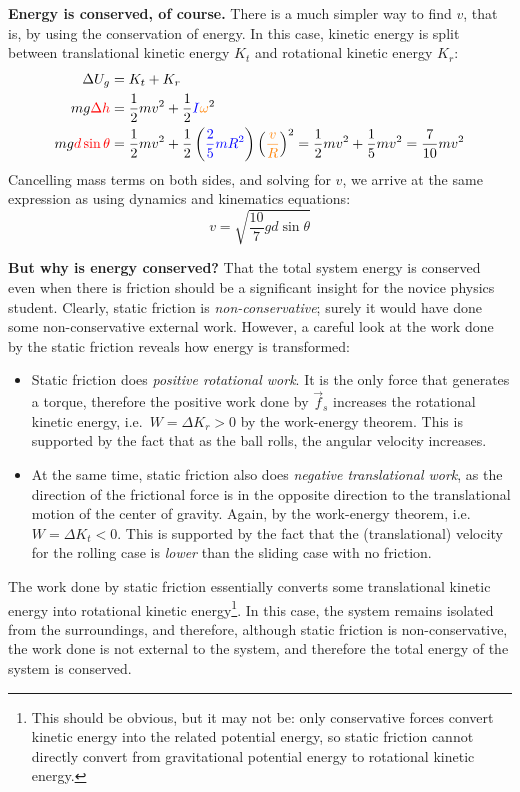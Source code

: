 \documentclass{../../oss-handout}
\begin{document}
\textbf{Energy is conserved, of course.} There is a much simpler way to find
$v$, that is, by using the conservation of energy. In this case, kinetic
energy is split between translational kinetic energy $K_t$ and rotational
kinetic energy $K_r$:
\begin{align*}
  \Delta U_g&=K_t+K_r\\
  mg\textcolor{red}{\Delta h}&=\frac12 mv^2+
  \frac12
  \textcolor{blue}{I}\textcolor{orange}{\omega}^2\\
  mg\textcolor{red}{d\sin\theta}&=\frac12 mv^2+\frac12
  \left(\textcolor{blue}{\frac25 mR^2}\right)
  \left(\textcolor{orange}{\frac vR}\right)^2
  =\frac12 mv^2+\frac15mv^2=\frac7{10}mv^2
\end{align*}
Cancelling mass terms on both sides, and solving for $v$, we arrive at
the same expression as using dynamics and kinematics equations:
\begin{equation}
  v=\sqrt{\frac{10}{7}gd\sin\theta}
\end{equation}

\textbf{But why is energy conserved?} That the total system energy is conserved
even when there is friction should be a significant insight for the novice
physics student. Clearly, static friction is \emph{non-conservative}; surely it
would have done some non-conservative external work. However, a careful look at
the work done by the static friction reveals how energy is transformed:
\begin{itemize}[topsep=0pt]
\item Static friction does \emph{positive rotational work}. It is the only
  force that generates a torque, therefore the positive work done by $\vec f_s$
  increases the rotational kinetic energy, i.e.\ $W=\Delta K_r>0$ by the
  work-energy theorem. This is supported by the fact that as the ball rolls, the
  angular velocity increases.
\item At the same time, static friction also does \emph{negative translational
  work}, as the direction of the frictional force is in the opposite direction
  to the translational motion of the center of gravity. Again, by the
  work-energy theorem, i.e.\ $W=\Delta K_t<0$. This is supported by the fact
  that the (translational) velocity for the rolling case is \emph{lower} than
  the sliding case with no friction.
\end{itemize}
The work done by static friction essentially converts some translational kinetic
energy into rotational kinetic energy\footnote{This should be obvious, but it
  may not be: only conservative forces convert kinetic energy into the related
  potential energy, so static friction cannot directly convert from gravitational
  potential energy to rotational kinetic energy.}. In this case, the system
remains isolated from the surroundings, and therefore, although static friction
is non-conservative, the work done is not external to the system, and therefore
the total energy of the system is conserved.
\end{document}
